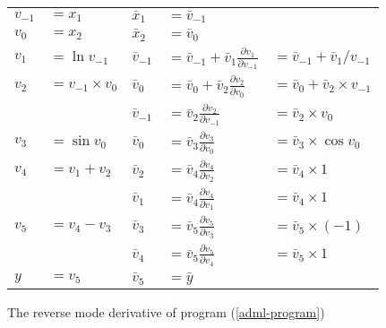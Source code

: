 \documentclass[12pt]{article}
\begin{document}
  \newcommand{\diff}[2]{
    \bar{v}_{#1} \frac{\partial v_{#1}}{\partial v_{#2}}
  }

\begin{figure}[t]
\center
\begin{tabular}[t]{ll|lll}

  $v_{-1}$ & $= x_1$
  &
  $\bar{x}_1$ & $= \bar{v}_{-1}$
  \\
  
  $v_{0}$ & $= x_2$
  &
  $\bar{x}_2$ & $= \bar{v}_{0}$
  \\

  \hline

  $v_1$ & $= \ln{v_{-1}}$
  &
  \(\bar{v}_{-1}\)
  &
  \(= \bar{v}_{-1} + \diff{1}{-1}\)
  &
  \(= \bar{v}_{-1} + \bar{v}_1 / v_{-1}
  \) \\

  $v_2$ & $= v_{-1} \times v_0$
  &
  \(\bar{v}_0\)
  &
  \(= \bar{v}_0 + \diff{2}{0}\)
  &
  \(= \bar{v}_0 + \bar{v}_2 \times v_{-1}
  \) \\

  &
  &
  \(\bar{v}_{-1}\)
  &
  \(= \diff{2}{-1}\)
  &
  \(
  = \bar{v}_2 \times v_{0}
  \) \\

  $v_3$ & $= \sin{v_0}$
  &
  \(\bar{v}_0\)
  &
  \(= \diff{3}{0}\)
  &
  \(
  = \bar{v}_3 \times \cos v_0
  \) \\

  $v_4$ & $= v_1 + v_2$
  &
  \(\bar{v}_2\)
  &
  \(= \diff{4}{2}\)
  &
  \(
  = \bar{v}_4 \times 1
  \) \\

  &
  &
  \(\bar{v}_1\)
  &
  \(= \diff{4}{1}\)
  &
  \(
  = \bar{v}_4 \times 1
  \) \\

  $v_5$ & $= v_4 - v_3$
  &
  \(\bar{v}_3\)
  &
  \(= \diff{5}{3}\)
  &
  \(
  = \bar{v}_5 \times (-1)
  \) \\
  
  &
  &
  \(\bar{v}_4\)
  &
  \(= \diff{5}{4}\)
  &
  \(
  = \bar{v}_5 \times 1
  \) \\
  
  \hline

  $y$ & $= v_5$
  &
  $\bar{v}_5$ & $= \bar{y}$
  \\

\end{tabular}
\caption{\label{adml-diff} The reverse mode derivative of program
  (\ref{adml-program})}
\end{figure}
\end{document}
